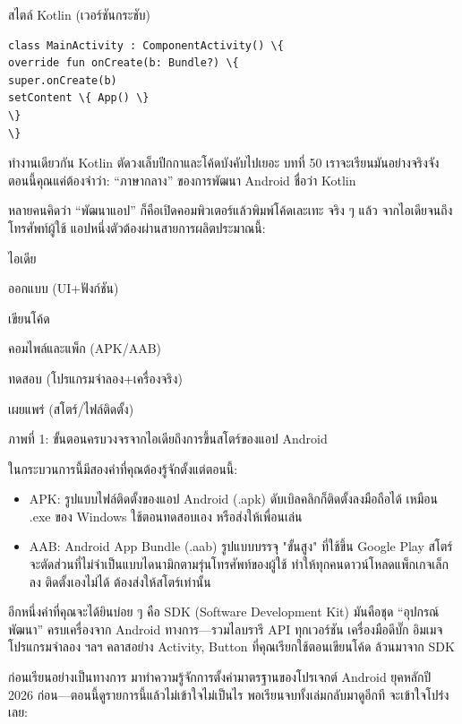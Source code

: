 สไตล์ Kotlin (เวอร์ชันกระชับ)

\begin{lstlisting}
class MainActivity : ComponentActivity() \{
override fun onCreate(b: Bundle?) \{
super.onCreate(b)
setContent \{ App() \}
\}
\}
\end{lstlisting}

ทำงานเดียวกัน Kotlin ตัดวงเล็บปีกกาและโค้ดบังคับไปเยอะ บทที่ 50 เราจะเรียนมันอย่างจริงจัง ตอนนี้คุณแค่ต้องจำว่า: “ภาษากลาง” ของการพัฒนา Android ชื่อว่า Kotlin


หลายคนคิดว่า “พัฒนาแอป” ก็คือเปิดคอมพิวเตอร์แล้วพิมพ์โค้ดเละเทะ จริง ๆ แล้ว จากไอเดียจนถึงโทรศัพท์ผู้ใช้ แอปหนึ่งตัวต้องผ่านสายการผลิตประมาณนี้:

ไอเดีย

ออกแบบ (UI+ฟังก์ชัน)

เขียนโค้ด

คอมไพล์และแพ็ก (APK/AAB)

ทดสอบ (โปรแกรมจำลอง+เครื่องจริง)

เผยแพร่ (สโตร์/ไฟล์ติดตั้ง)

\begin{center}\small\color{gray}ภาพที่ 1: ขั้นตอนครบวงจรจากไอเดียถึงการขึ้นสโตร์ของแอป Android\end{center}

ในกระบวนการนี้มีสองคำที่คุณต้องรู้จักตั้งแต่ตอนนี้:

\begin{itemize}
  \item APK: รูปแบบไฟล์ติดตั้งของแอป Android (.apk) ดับเบิลคลิกก็ติดตั้งลงมือถือได้ เหมือน .exe ของ Windows ใช้ตอนทดสอบเอง หรือส่งให้เพื่อนเล่น
  \item AAB: Android App Bundle (.aab) รูปแบบบรรจุ "ขั้นสูง" ที่ใช้ขึ้น Google Play สโตร์จะตัดส่วนที่ไม่จำเป็นแบบไดนามิกตามรุ่นโทรศัพท์ของผู้ใช้ ทำให้ทุกคนดาวน์โหลดแพ็กเกจเล็กลง ติดตั้งเองไม่ได้ ต้องส่งให้สโตร์เท่านั้น
\end{itemize}

อีกหนึ่งคำที่คุณจะได้ยินบ่อย ๆ คือ SDK (Software Development Kit) มันคือชุด “อุปกรณ์พัฒนา” ครบเครื่องจาก Android ทางการ—รวมไลบรารี API ทุกเวอร์ชัน เครื่องมือดีบั๊ก อิมเมจโปรแกรมจำลอง ฯลฯ คลาสอย่าง Activity, Button ที่คุณเรียกใช้ตอนเขียนโค้ด ล้วนมาจาก SDK


ก่อนเรียนอย่างเป็นทางการ มาทำความรู้จักการตั้งค่ามาตรฐานของโปรเจกต์ Android ยุคหลักปี 2026 ก่อน—ตอนนี้ดูรายการนี้แล้วไม่เข้าใจไม่เป็นไร พอเรียนจบทั้งเล่มกลับมาดูอีกที จะเข้าใจโปร่งเลย:

